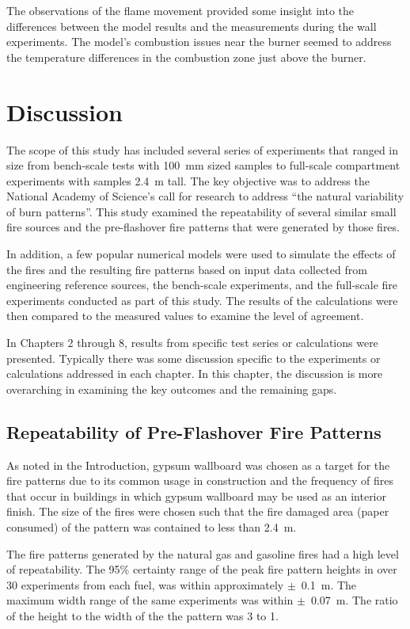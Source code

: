 \documentclass[twoside]{uocthesis}
\begin{document}
{The observations of the flame movement provided some insight into the differences between the model results and the measurements during the wall experiments.  The model's combustion issues near the burner seemed to address the temperature differences in the combustion zone just above the burner.    

\chapter{Discussion}

The scope of this study has included several series of experiments that ranged in size from bench-scale tests with 100~mm sized samples to full-scale compartment experiments with samples 2.4~m tall. The key objective was to address the National Academy of Science's call for research to address ``the natural variability of burn patterns''. This study examined the repeatability of several similar small fire sources and the pre-flashover fire patterns that were generated by those fires. 

In addition, a few popular numerical models were used to simulate the effects of the fires and the resulting fire patterns based on input data collected from engineering reference sources, the bench-scale experiments, and the full-scale fire experiments conducted as part of this study.  The results of the calculations were then compared to the measured values to examine the level of agreement.  

In Chapters 2 through 8, results from specific test series or calculations were presented.  Typically there was some discussion specific to the experiments or calculations addressed in each chapter.  In this chapter, the discussion is more overarching in examining the key outcomes and the remaining gaps.   

\section{Repeatability of Pre-Flashover Fire Patterns}

As noted in the Introduction, gypsum wallboard was chosen as a target for the fire patterns due to its common usage in construction and the frequency of fires that occur in buildings in which gypsum wallboard may be used as an interior finish. The size of the fires were chosen such that the fire damaged area (paper consumed) of the pattern was contained to less than 2.4~m.  

The fire patterns generated by the natural gas and gasoline fires had a high level of repeatability.  The 95\% certainty range of the peak fire pattern heights in over 30 experiments from each fuel, was within approximately $\pm$~0.1~m.  The maximum width range of the same experiments was within $\pm$~0.07~m.  The ratio of the height to the width of the the pattern was 3 to 1.

}
\end{document}
